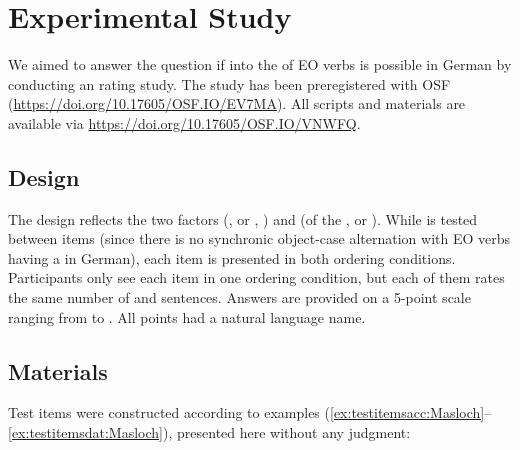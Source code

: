 \documentclass[output=paper,colorlinks,citecolor=brown]{langscibook}
\begin{document}
\section{Experimental Study}
\label{sec:study:Masloch}

We aimed to answer the question if   into the  of EO verbs is possible in German by conducting an  rating study.
The study has been preregistered with OSF (\url{https://doi.org/10.17605/OSF.IO/EV7MA}).
All scripts and materials are available via \url{https://doi.org/10.17605/OSF.IO/VNWFQ}.

\subsection{Design}
\label{sec:design:Masloch}

The design reflects the two factors  (,  or , ) and  (of the ,  or ).
While  is tested between items (since there is no synchronic object-case alternation with EO verbs having a  in German), each item is presented in both ordering conditions.
Participants only see each item in one ordering condition, but each of them rates the same number of  and  sentences.
Answers are provided on a 5-point scale ranging from  to .
All points had a natural language name.

\subsection{Materials}
\label{sec:materials:Masloch}

Test items were constructed according to examples (\ref{ex:testitemsacc:Masloch}--\ref{ex:testitemsdat:Masloch}), presented here without any  judgment:
\end{document}
